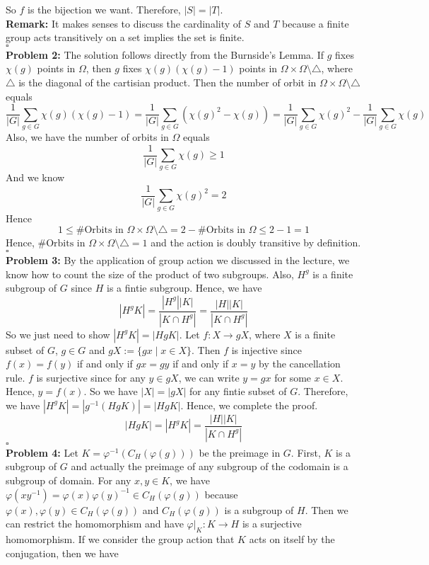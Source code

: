 \documentclass[12pt]{amsart}
\begin{document}
So $f$ is the bijection we want. Therefore, $|S|=|T|$.\\
\textbf{Remark:} It makes senses to discuss the cardinality of $S$ and $T$ because a finite group acts transitively on a set implies the set is finite.
\\\phantom{qed}\hfill$\square$\\
\textbf{Problem 2:} The solution follows directly from the Burnside's Lemma. If $g$ fixes $\chi(g)$ points in $\Omega$, then $g$ fixes $\chi(g)(\chi(g)-1)$ points in $\Omega\times \Omega\setminus\triangle$, where $\triangle$ is the diagonal of the cartisian product. Then the number of orbit in $\Omega\times \Omega\setminus\triangle$ equals
\[\frac{1}{|G|}\sum_{g\in G}\chi(g)(\chi(g)-1)=\frac{1}{|G|}\sum_{g\in G}(\chi(g)^2-\chi(g))=\frac{1}{|G|}\sum_{g\in G}\chi(g)^2-\frac{1}{|G|}\sum_{g\in G}\chi(g)\]
Also, we have the number of orbits in $\Omega$ equals
\[\frac{1}{|G|}\sum_{g\in G}\chi(g)\geq 1\]
And we know
\[\frac{1}{|G|}\sum_{g\in G}\chi(g)^2=2\]
Hence
\[1\leq\#\text{Orbits in }\Omega\times \Omega\setminus\triangle=2-\#\text{Orbits in }\Omega\leq 2-1=1\]
Hence, $\#\text{Orbits in }\Omega\times \Omega\setminus\triangle=1$ and the action is doubly transitive by definition.
\\\phantom{qed}\hfill$\square$\\
\textbf{Problem 3:}
By the application of group action we discussed in the lecture, we know how to count the size of the product of two subgroups. Also, $H^g$ is a finite subgroup of $G$ since $H$ is a fintie subgroup. Hence, we have
\[|H^gK|=\frac{|H^g||K|}{|K\cap H^g|}=\frac{|H||K|}{|K\cap H^g|}\]
So we just need to show $|H^gK|=|HgK|$. Let $f:X \to gX$, where $X$ is a finite subset of $G$, $g\in G$ and $gX:=\{gx\mid x\in X\}$. Then $f$ is injective since $f(x)=f(y)$ if and only if $gx=gy$ if and only if $x=y$ by the cancellation rule. $f$ is surjective since for any $y\in gX$, we can write $y=gx$ for some $x\in X$. Hence, $y=f(x)$. So we have $|X|=|gX|$ for any fintie subset of $G$. Therefore, we have $|H^gK|=|g^{-1}(HgK)|=|HgK|$. Hence, we complete the proof.
\[|HgK|=|H^gK|=\frac{|H||K|}{|K\cap H^g|}\]
\phantom{qed}\hfill$\square$\\
\textbf{Problem 4:} Let $K=\varphi^{-1}(C_H(\varphi(g)))$ be the preimage in $G$. First, $K$ is a subgroup of $G$ and actually the preimage of any subgroup of the codomain is a subgroup of domain. For any $x,y\in K$, we have $\varphi(xy^{-1})=\varphi(x)\varphi(y)^{-1}\in C_H(\varphi(g))$ because $\varphi(x),\varphi(y)\in C_H(\varphi(g))$ and $C_H(\varphi(g))$ is a subgroup of $H$. Then we can restrict the homomorphism and have $\varphi|_K: K\to H$ is a surjective homomorphism. If we consider the group action that $K$ acts on itself by the conjugation, then we have
\end{document}
